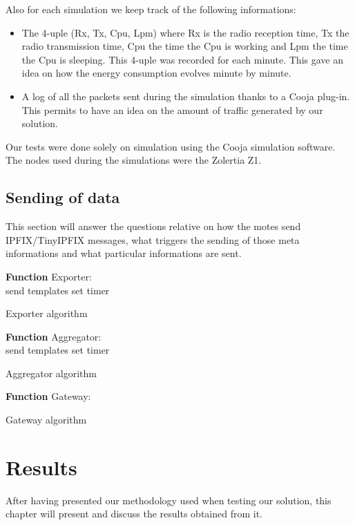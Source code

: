 Also for each simulation we keep track of the following informations:
\begin{itemize}
  \item The 4-uple (Rx, Tx, Cpu, Lpm) where Rx is the radio reception time, Tx the radio transmission time, Cpu the time the Cpu is working and Lpm the time the Cpu is sleeping. This 4-uple was recorded for each minute. This gave an idea on how the energy consumption evolves minute by minute.
  \item A log of all the packets sent during the simulation thanks to a Cooja plug-in. This permits to have an idea on the amount of traffic generated by our solution.\\
\end{itemize}

Our tests were done solely on simulation using the Cooja simulation software. The nodes used during the simulations were the Zolertia Z1.

\section{Sending of data}

This section will answer the questions relative on how the motes send IPFIX/TinyIPFIX messages, what triggers the sending of those meta informations and what particular informations are sent.\\

\begin{algorithm}
  \textbf{Function} Exporter:\\
  send templates\;
  set timer\;
 \caption{Exporter algorithm}
 \label{algo:exporter}
\end{algorithm}


\begin{algorithm}
  \textbf{Function} Aggregator:\\
  send templates\;
  set timer\;
 \caption{Aggregator algorithm}
 \label{algo:aggregator}
\end{algorithm}

\begin{algorithm}
  \textbf{Function} Gateway:\\
 \caption{Gateway algorithm}
 \label{algo:gateway}
\end{algorithm}


\chapter{Results}

After having presented our methodology used when testing our solution, this chapter will present and discuss the results obtained from it.
